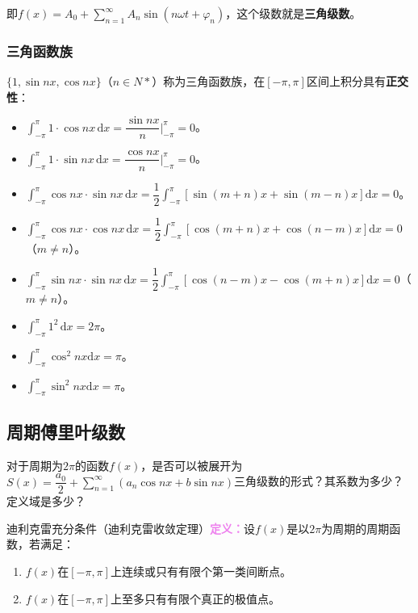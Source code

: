 \documentclass[UTF8, 12pt]{ctexart}
\begin{document}
        即$f(x)=A_0+\sum\limits_{n=1}^\infty A_n\sin(n\omega t+\varphi_n)$，这个级数就是\textbf{三角级数}。

        \subsubsection{三角函数族}

        $\{1,\sin nx,\cos nx\}$（$n\in N*$）称为三角函数族，在$[-\pi,\pi]$区间上积分具有\textbf{正交性}：

        \begin{itemize}
            \item $\displaystyle{\int_{-\pi}^\pi1\cdot\cos nx\,\textrm{d}x}=\dfrac{\sin nx}{n}\bigg\vert_{-\pi}^\pi=0$。
            \item $\displaystyle{\int_{-\pi}^\pi1\cdot\sin nx\,\textrm{d}x}=\dfrac{\cos nx}{n}\bigg\vert_{-\pi}^\pi=0$。
            \item $\displaystyle{\int_{-\pi}^\pi\cos nx\cdot\sin nx\,\textrm{d}x=\dfrac{1}{2}\int_{-\pi}^\pi[\sin(m+n)x+\sin(m-n)x]\textrm{d}x}=0$。
            \item $\displaystyle{\int_{-\pi}^\pi\cos nx\cdot\cos nx\,\textrm{d}x=\dfrac{1}{2}\int_{-\pi}^\pi[\cos(m+n)x+\cos(n-m)x]\textrm{d}x}=0$（$m\neq n$）。
            \item $\displaystyle{\int_{-\pi}^\pi\sin nx\cdot\sin nx\,\textrm{d}x=\dfrac{1}{2}\int_{-\pi}^\pi[\cos(n-m)x-\cos(m+n)x]\textrm{d}x}=0$（$m\neq n$）。
            \item $\displaystyle{\int_{-\pi}^\pi1^2\,\textrm{d}x=2\pi}$。
            \item $\displaystyle{\int_{-\pi}^\pi\cos^2nx\textrm{d}x=\pi}$。
            \item $\displaystyle{\int_{-\pi}^\pi\sin^2nx\textrm{d}x=\pi}$。
        \end{itemize}

        \subsection{周期傅里叶级数}

        对于周期为$2\pi$的函数$f(x)$，是否可以被展开为$S(x)=\dfrac{a_0}{2}+\sum\limits_{n=1}^\infty(a_n\cos nx+b\sin nx)$三角级数的形式？其系数为多少？定义域是多少？

        迪利克雷充分条件（迪利克雷收敛定理）\textcolor{violet}{\textbf{定义：}}设$f(x)$是以$2\pi$为周期的周期函数，若满足：

        \begin{enumerate}
            \item  $f(x)$在$[-\pi,\pi]$上连续或只有有限个第一类间断点。
            \item $f(x)$在$[-\pi,\pi]$上至多只有有限个真正的极值点。
        \end{enumerate}
\end{document}
